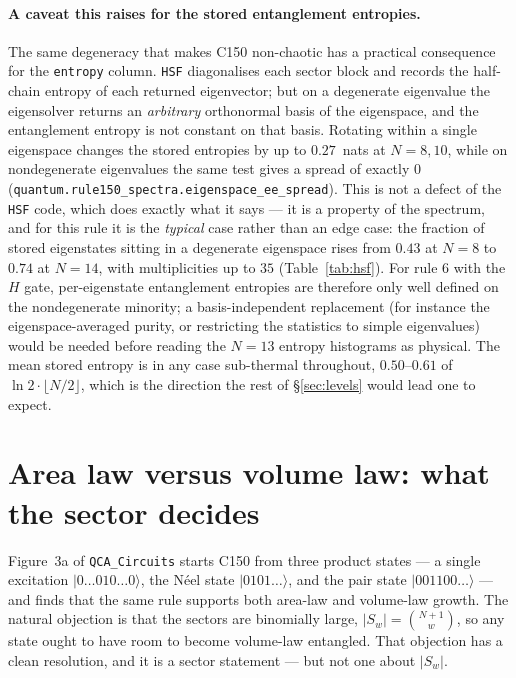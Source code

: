 \documentclass[11pt]{article}
\newcommand{\rt}[1]{\texttt{#1}}
\newcommand{\fn}[1]{\texttt{#1}}
\providecommand{\ket}[1]{|#1\rangle}
\theoremstyle{plain}
\theoremstyle{definition}
\begin{document}
\paragraph{A caveat this raises for the stored entanglement entropies.} The same
degeneracy that makes C150 non-chaotic has a practical consequence for the
\rt{entropy} column. \rt{HSF} diagonalises each sector block and records the
half-chain entropy of each returned eigenvector; but on a degenerate eigenvalue
the eigensolver returns an \emph{arbitrary} orthonormal basis of the eigenspace,
and the entanglement entropy is not constant on that basis. Rotating within a
single eigenspace changes the stored entropies by up to $0.27$~nats at $N=8,10$,
while on nondegenerate eigenvalues the same test gives a spread of exactly $0$
(\fn{quantum.rule150\_spectra.eigenspace\_ee\_spread}). This is not a defect of
the \rt{HSF} code, which does exactly what it says --- it is a property of the
spectrum, and for this rule it is the \emph{typical} case rather than an edge
case: the fraction of stored eigenstates sitting in a degenerate eigenspace rises
from $0.43$ at $N=8$ to $0.74$ at $N=14$, with multiplicities up to $35$
(Table~\ref{tab:hsf}). For rule $6$ with the $H$ gate, per-eigenstate
entanglement entropies are therefore only well defined on the nondegenerate
minority; a basis-independent replacement (for instance the eigenspace-averaged
purity, or restricting the statistics to simple eigenvalues) would be needed
before reading the $N=13$ entropy histograms as physical. The mean stored
entropy is in any case sub-thermal throughout, $0.50$--$0.61$ of $\ln 2\cdot
\lfloor N/2\rfloor$, which is the direction the rest of \S\ref{sec:levels} would
lead one to expect.

\section{Area law versus volume law: what the sector decides}
\label{sec:ent}

Figure~3a of \fn{QCA\_Circuits} starts C150 from three product states --- a
single excitation $\ket{0\ldots010\ldots0}$, the N\'eel state
$\ket{0101\ldots}$, and the pair state $\ket{001100\ldots}$ --- and finds that
the same rule supports both area-law and volume-law growth. The natural
objection is that the sectors are binomially large, $|S_w|=\binom{N+1}{w}$, so
any state ought to have room to become volume-law entangled. That objection has
a clean resolution, and it is a sector statement --- but not one about
$|S_w|$.
\end{document}
